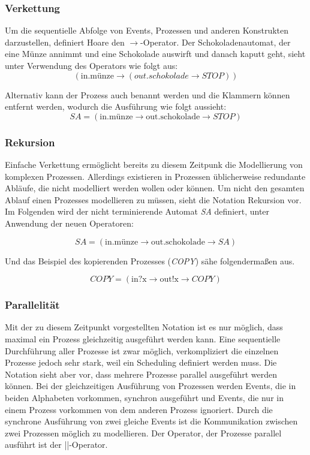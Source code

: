 \subsubsection{Verkettung}
Um die sequentielle Abfolge von Events, Prozessen und anderen Konstrukten darzustellen, definiert Hoare den 
$ \rightarrow $-Operator. Der Schokoladenautomat, der eine Münze annimmt und eine Schokolade auswirft und danach kaputt geht, sieht unter Verwendung des Operators wie folgt aus:
\[(\text{in.münze} \rightarrow (out.schokolade \rightarrow STOP))\]

Alternativ kann der Prozess auch benannt werden und die Klammern können entfernt werden, wodurch die Ausführung wie folgt aussieht: 
\[SA = (\text{in.münze} \rightarrow \text{out.schokolade} \rightarrow STOP)\]

\subsubsection{Rekursion}
Einfache Verkettung ermöglicht bereits zu diesem Zeitpunk die Modellierung von komplexen Prozessen. Allerdings existieren in Prozessen üblicherweise redundante Abläufe, die nicht modelliert werden wollen oder können. Um nicht den gesamten Ablauf einen Prozesses modellieren zu müssen, sieht die Notation Rekursion vor. 
Im Folgenden wird der nicht terminierende Automat \textit{SA} definiert, unter Anwendung der neuen Operatoren:

\[SA = (\text{in.münze} \rightarrow \text{out.schokolade} \rightarrow SA)\]

Und das Beispiel des kopierenden Prozesses (\textit{COPY}) sähe folgendermaßen aus.

\[COPY = (\text{in?x} \rightarrow \text{out!x} \rightarrow COPY)\]

\subsubsection{Parallelität}
Mit der zu diesem Zeitpunkt vorgestellten Notation ist es nur möglich, dass maximal ein Prozess gleichzeitig ausgeführt werden kann. Eine sequentielle Durchführung aller Prozesse ist zwar möglich, verkompliziert die einzelnen Prozesse jedoch sehr stark, weil ein Scheduling definiert werden muss. Die Notation sieht aber vor, dass mehrere Prozesse parallel ausgeführt werden können. Bei der gleichzeitigen Ausführung von Prozessen werden Events, die in beiden Alphabeten vorkommen, synchron ausgeführt und Events, die nur in einem Prozess vorkommen von dem anderen Prozess ignoriert. Durch die synchrone Ausführung von zwei gleiche Events ist die Kommunikation zwischen zwei Prozessen möglich zu modellieren. Der Operator, der Prozesse parallel ausführt ist der ||-Operator. 


